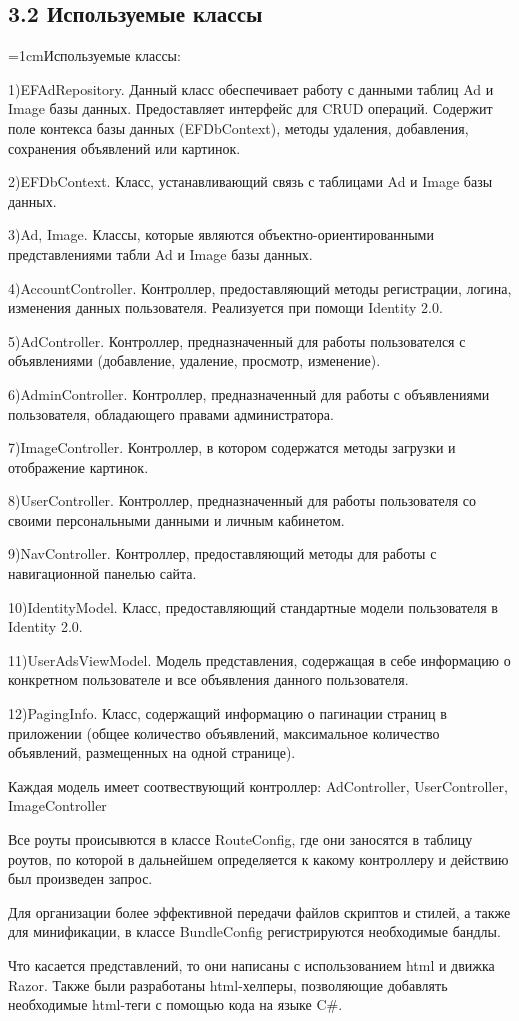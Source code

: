 \documentclass[14pt,a4paper]{extreport}
\begin{document}
	\subsection*{\normalsize\hspace{4ex}3.2 Используемые классы}
	\parindent=1cmИспользуемые классы:\par
	1)EFAdRepository. Данный класс обеспечивает работу с данными таблиц Ad и Image базы данных. Предоставляет интерфейс для CRUD операций. Содержит поле контекса базы данных (EFDbContext), методы удаления, добавления, сохранения объявлений или картинок. \par
	2)EFDbContext. Класс, устанавливающий связь с таблицами Ad и Image базы данных.\par
	3)Ad, Image. Классы, которые являются объектно-ориентированными представлениями табли Ad и Image базы данных.\par
	4)AccountController. Контроллер, предоставляющий методы регистрации, логина, изменения данных пользователя. Реализуется при помощи Identity 2.0. \par
	5)AdController. Контроллер, предназначенный для работы пользователся с объявлениями (добавление, удаление, просмотр, изменение).\par
	6)AdminController. Контроллер, предназначенный для работы с объявлениями пользователя, обладающего правами администратора.\par
	7)ImageController. Контроллер, в котором содержатся методы загрузки и отображение картинок.\par
	8)UserController. Контроллер, предназначенный для работы пользователя со своими персональными данными и личным кабинетом.\par
	9)NavController. Контроллер, предоставляющий методы для работы с навигационной панелью сайта.\par
	10)IdentityModel. Класс, предоставляющий стандартные модели пользователя в Identity 2.0.\par
	11)UserAdsViewModel. Модель представления, содержащая в себе информацию о конкретном пользователе и все объявления данного пользователя.\par
	12)PagingInfo. Класс, содержащий информацию о пагинации страниц в приложении (общее количество объявлений, максимальное количество объявлений, размещенных на одной странице).\par
	Каждая модель имеет соотвествующий контроллер: AdController, UserController, ImageController\par
	Все роуты происывются в классе RouteConfig, где они заносятся в таблицу роутов, по которой в дальнейшем определяется к какому контроллеру и действию был произведен запрос.\par
	Для организации более эффективной передачи файлов скриптов и стилей, а также для минификации, в классе BundleConfig регистрируются необходимые бандлы.\par
	Что касается представлений, то они написаны с использованием html и движка Razor. Также были разработаны html-хелперы, позволяющие добавлять необходимые html-теги с помощью кода на языке C\#.\par
\end{document}
